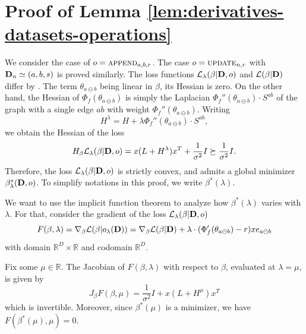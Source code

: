 \documentclass{article}
\DeclareMathOperator*{\append}{\textsc{append}}
\DeclareMathOperator*{\update}{\textsc{update}}
\newcommand{\cL}{\mathcal L}
\newcommand{\bD}{{\bf D}}
\newcommand{\ab}{a\ominus{} b}
\begin{document}
\section{Proof of Lemma \ref{lem:derivatives-datasets-operations}}
\label{app:differential}
    We consider the case of $o = \append_{a, b, r}$.
    The case $o = \update_{n, r}$ with $\bD_n\simeq (a, b, s)$ is proved similarly.
    The loss functions $\cL_\lambda(\beta | \bD, o)$
    and $\cL(\beta | \bD)$
    differ by \gbreplace{$\Phi_f(\theta_{\ab}) - r \theta_{\ab}$}{$\lambda (\Phi_f(\theta_{\ab}(\beta)) - r \theta_{\ab}(\beta)$)}.
    The term $\theta_{\ab}$ being linear in $\beta$, its Hessian is zero.
    On the other hand, the Hessian of $\Phi_f(\theta_{\ab})$
    is simply the Laplacian $\Phi_f''(\theta_{\ab}) \cdot S^{ab}$ of the graph with a single edge $ab$ with weight
    $\Phi_f''(\theta_{\ab})$.
    Writing
    \begin{equation}
        H^\lambda = H + \lambda \Phi_f''(\theta_{\ab}) \cdot S^{ab},
    \end{equation}
    we obtain the Hessian of the loss
    \begin{equation}
        H_\beta \cL_\lambda(\beta | \bD, o) = x (L + H^\lambda )x^T + \frac{1}{\sigma^2}I \succeq \frac{1}{\sigma^2}I.
    \end{equation}
    Therefore, the loss $\cL_\lambda(\beta | \bD, o)$ 
    is strictly convex, and admits a global minimizer $\beta^*_\lambda(\bD,o)$.
    To simplify notations in this proof, we write $\beta^*(\lambda)$.

    We want to use the implicit function theorem
    to analyze how $\beta^*(\lambda)$ varies with $\lambda$.
    For that, consider the gradient of the loss 
    $\cL_\lambda(\beta | \bD, o)$
    \begin{equation}
        F(\beta, \lambda) = \nabla_\beta \cL(\beta | o_\lambda(\bD))
        = \nabla_\beta \cL(\beta | \bD) 
        + \lambda \cdot (\Phi'_f(\theta_{\ab}) - r) x e_{\ab}
    \end{equation}
    with domain $\mathbb{R}^D \times \mathbb{R}$
    and codomain $\mathbb{R}^D$.
    
    Fix some $\mu \in \mathbb{R}$.
    The Jacobian of $F(\beta,\lambda)$ with respect to $\beta$,
    evaluated at $\lambda = \mu$,
    is given by
    \begin{equation}
        J_\beta F(\beta, \mu) = \frac{1}{\sigma^2}I + x(L + H^\mu)x^T
    \end{equation}
    which is invertible.
    Moreover, since $\beta^*(\mu)$ is a minimizer, 
    we have $F(\beta^*(\mu), \mu) = 0$.
\end{document}
